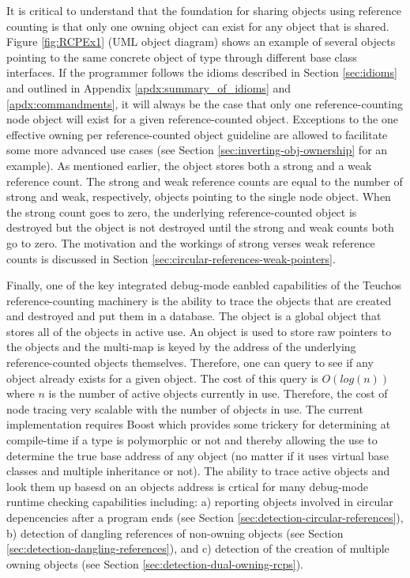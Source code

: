 \documentclass[pdf,ps2pdf,11pt]{SANDreport}
\begin{document}
It is critical to understand that the foundation for sharing objects
using reference counting is that only one owning {}
object can exist for any object that is shared.  Figure
{}\ref{fig:RCPEx1} (UML object diagram) shows an example of several
{} objects pointing to the same concrete object of type
{} through different base class interfaces.  If the
programmer follows the idioms described in Section {}\ref{sec:idioms}
and outlined in Appendix {}\ref{apdx:summary_of_idioms} and
{}\ref{apdx:commandments}, it will always be the case that only one
reference-counting node object will exist for a given
reference-counted object.  Exceptions to the one effective owning
{} per reference-counted object guideline are allowed
to facilitate some more advanced use cases (see Section
{}\ref{sec:inverting-obj-ownership} for an example).  As mentioned
earlier, the {} object stores both a strong and a weak
reference count.  The strong and weak reference counts are equal to
the number of strong and weak, respectively, {} objects
pointing to the single {} node object.  When the strong
count goes to zero, the underlying reference-counted object is
destroyed but the {} object is not destroyed until
the strong and weak counts both go to zero.  The motivation and the
workings of strong verses weak reference counts is discussed in
Section {}\ref{sec:circular-references-weak-pointers}.

Finally, one of the key integrated debug-mode eanbled capabilities of
the Teuchos reference-counting machinery is the ability to trace the
{} objects that are created and destroyed and put them
in a database.  The {} object is a global object
that stores all of the {} objects in active use.  An
{} object is used to store raw pointers to the
{} objects and the multi-map is keyed by the
{} address of the underlying reference-counted objects
themselves.  Therefore, one can query to see if any {}
object already exists for a given object.  The cost of this query is
$O(log(n))$ where $n$ is the number of active {}
objects currently in use.  Therefore, the cost of node tracing very
scalable with the number of {} objects in use.  The
current implementation requires Boost which provides some trickery for
determining at compile-time if a type is polymorphic or not and
thereby allowing the use {} to
determine the true base address of any object (no matter if it uses
virtual base classes and multiple inheritance or not).  The ability to
trace active {} objects and look them up basesd on an
objects address is crtical for many debug-mode runtime checking
capabilities including: a) reporting objects involved in circular
depencencies after a program ends (see Section
{}\ref{sec:detection-circular-references}), b) detection of dangling
references of non-owning {} objects (see Section
{}\ref{sec:detection-dangling-references}), and c) detection of the
creation of multiple owning {} objects (see Section
{}\ref{sec:detection-dual-owning-rcps}).
\end{document}
